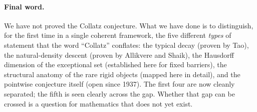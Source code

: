 \documentclass[12pt,a4paper]{article}
\begin{document}
\paragraph{Final word.}
We have not proved the Collatz conjecture.  What we have done is to
distinguish, for the first time in a single coherent framework, the five
different \emph{types} of statement that the word ``Collatz'' conflates:
the typical decay (proven by Tao), the natural-density descent (proven by
Allikvere and Shaik), the Hausdorff dimension of the exceptional set
(established here for fixed barriers), the structural anatomy of the rare
rigid objects (mapped here in detail), and the pointwise conjecture itself
(open since 1937).  The first four are now cleanly separated; the fifth is
seen clearly across the gap.  Whether that gap can be crossed is a question
for mathematics that does not yet exist.
\end{document}
